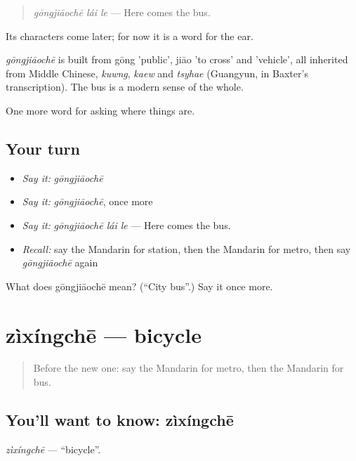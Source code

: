 \begin{quote}
\emph{gōngjiāochē lái le} — Here comes the bus.
\end{quote}

Its characters come later; for now it is a word for the ear.

\begin{cousinweb}
\emph{gōngjiāochē} is built from gōng 'public', jiāo 'to cross' and  'vehicle', all inherited from Middle Chinese, \emph{kuwng}, \emph{kaew} and \emph{tsyhae} (Guangyun, in Baxter's transcription). The bus is a modern sense of the whole.
\end{cousinweb}

\begin{grammarlens}[title={What you've built}]
One more word for asking where things are.
\end{grammarlens}

\subsection*{Your turn}
\begin{itemize}
\raggedright
  \item \emph{Say it:} \emph{gōngjiāochē}
  \item \emph{Say it:} \emph{gōngjiāochē}, once more
  \item \emph{Say it:} \emph{gōngjiāochē lái le} — Here comes the bus.
  \item \emph{Recall:} say the Mandarin for station, then the Mandarin for metro, then say \emph{gōngjiāochē} again
\end{itemize}

\begin{tcolorbox}[breakable,colback=teal!4,colframe=teal!35!black,title={Before you move on}]
What does gōngjiāochē mean? (\textquotedblleft{}City bus\textquotedblright{}.) Say it once more.
\end{tcolorbox}
\section[zìxíngchē]{zìxíngchē — bicycle}

\label{lesson:ZH-C106-zixingche}



\begin{quote}
Before the new one: say the Mandarin for metro, then the Mandarin for bus.
\end{quote}

\subsection*{You'll want to know: zìxíngchē}
\emph{zìxíngchē} — \textquotedblleft{}bicycle\textquotedblright{}.

